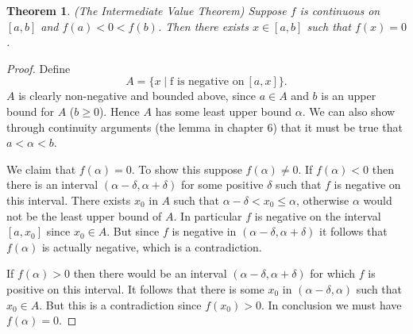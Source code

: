 \documentclass[12pt]{article}
\theoremstyle{definition}
\theoremstyle{plain}
\newtheorem{thm}{Theorem}
\begin{document}
\begin{thm} (The Intermediate Value Theorem)
	Suppose $f$ is continuous on $[a, b]$ and $f(a) < 0 < f(b)$. Then there exists $x \in [a, b]$ such that $f(x) = 0$.
\end{thm}
\begin{proof}
Define \[A = \{x \mid \text{f is negative on}~[a, x]\}.\] $A$ is clearly non-negative and bounded above, since $a \in A$ and $b$ is an upper bound for $A$ ($b \geq 0$). Hence $A$ has some least upper bound $\alpha$. We can also show through continuity arguments (the lemma in chapter 6) that it must be true that $a < \alpha < b$.

We claim that $f(\alpha) = 0$. To show this suppose $f(\alpha) \neq 0$. If $f(\alpha) < 0$ then there is an interval $(\alpha - \delta, \alpha + \delta)$ for some positive $\delta$ such that $f$ is negative on this interval. There exists $x_0$ in $A$ such that $\alpha - \delta < x_0 \leq \alpha$, otherwise $\alpha$ would not be the least upper bound of $A$. In particular $f$ is negative on the interval $[a, x_0]$ since $x_0 \in A$. But since $f$ is negative in $(\alpha - \delta, \alpha + \delta)$ it follows that $f(\alpha)$ is actually negative, which is a contradiction.

If $f(\alpha) > 0$ then there would be an interval $(\alpha - \delta, \alpha + \delta)$ for which $f$ is positive on this interval. It follows that there is some $x_0$ in $(\alpha - \delta, \alpha)$ such that $x_0 \in A$. But this is a contradiction since $f(x_0) > 0$. In conclusion we must have $f(\alpha) = 0$.
\end{proof}
\end{document}
